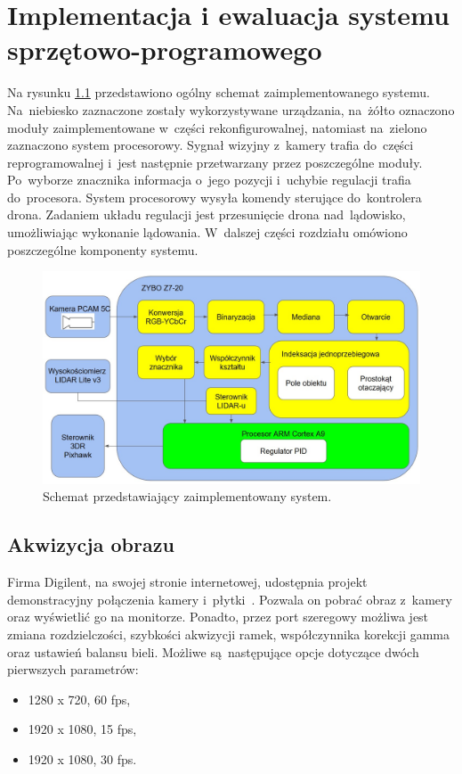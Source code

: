 \chapter{Implementacja i ewaluacja systemu sprzętowo-programowego}
\label{cha:implementacja_systemu}

Na rysunku \ref{fig:system} przedstawiono ogólny schemat zaimplementowanego systemu. 
Na~niebiesko zaznaczone zostały wykorzystywane urządzania, na~żółto oznaczono moduły zaimplementowane w~części rekonfigurowalnej, natomiast na~zielono zaznaczono system procesorowy. 
Sygnał wizyjny z~kamery trafia do~części reprogramowalnej i~jest następnie przetwarzany przez poszczególne moduły. 
Po~wyborze znacznika informacja o~jego pozycji i~uchybie regulacji trafia do~procesora. 
System procesorowy wysyła komendy sterujące do~kontrolera drona. 
Zadaniem układu regulacji jest przesunięcie drona nad~lądowisko, umożliwiając wykonanie lądowania.
W~dalszej części rozdziału omówiono poszczególne komponenty systemu. 

\begin{figure}[h]
	\centering
	\includegraphics[width=\textwidth]{system.jpg}
	\caption{Schemat przedstawiający zaimplementowany system.}
	\label{fig:system}
\end{figure} 

\section{Akwizycja obrazu}
\label{sec:akwizycja}
Firma Digilent, na swojej stronie internetowej, udostępnia projekt demonstracyjny połączenia kamery i~płytki~\cite{projektPCAM}. 
Pozwala on pobrać obraz z~kamery oraz wyświetlić go na monitorze.
Ponadto, przez port szeregowy możliwa jest zmiana rozdzielczości, szybkości akwizycji ramek, współczynnika korekcji gamma oraz ustawień balansu bieli. 
Możliwe są~następujące opcje dotyczące dwóch pierwszych parametrów:
\begin{itemize}
	\item 1280 x 720, 60 fps,
	\item 1920 x 1080, 15 fps,
	\item 1920 x 1080, 30 fps.
\end{itemize}

